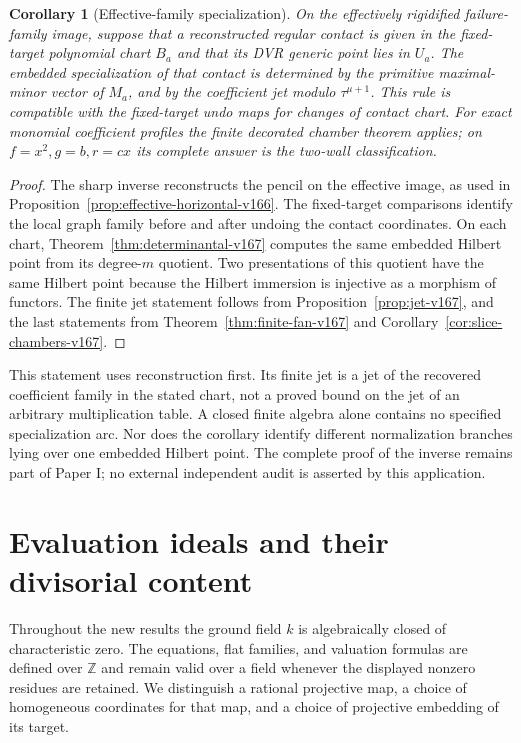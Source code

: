 \documentclass[11pt,reqno]{amsart}
\numberwithin{equation}{section}
\newtheorem{corollary}[theorem]{Corollary}
\theoremstyle{definition}\newtheorem{definition}[theorem]{Definition}
\theoremstyle{remark}\newtheorem{remark}[theorem]{Remark}
\begin{document}
\begin{corollary}[Effective-family specialization]
\label{cor:effective-states-v167}
On the effectively rigidified failure-family image, suppose that
a reconstructed regular contact is given in the fixed-target
polynomial chart $B_a$ and that its DVR generic point lies in
$U_a$. The embedded specialization of that contact is determined
by the primitive maximal-minor vector of $M_a$, and by the
coefficient jet modulo $\tau^{\mu+1}$. This rule is compatible
with the fixed-target undo maps for changes of contact chart.
For exact monomial coefficient profiles the finite decorated
chamber theorem applies; on $f=x^2,g=b,r=cx$ its complete answer
is the two-wall classification.
\end{corollary}
\begin{proof}
The sharp inverse reconstructs the pencil on the effective image,
as used in Proposition~\ref{prop:effective-horizontal-v166}.
The fixed-target comparisons identify the local graph family
before and after undoing the contact coordinates. On each chart,
Theorem~\ref{thm:determinantal-v167} computes the same embedded
Hilbert point from its degree-$m$ quotient. Two presentations
of this quotient have the same Hilbert point because the Hilbert
immersion is injective as a morphism of functors. The finite jet
statement follows from Proposition~\ref{prop:jet-v167}, and the
last statements from Theorem~\ref{thm:finite-fan-v167} and
Corollary~\ref{cor:slice-chambers-v167}.
\end{proof}
This statement uses reconstruction first. Its finite jet is a jet
of the recovered coefficient family in the stated chart, not a
proved bound on the jet of an arbitrary multiplication table.
A closed finite algebra alone contains no specified specialization
arc. Nor does the corollary identify different normalization
branches lying over one embedded Hilbert point. The complete
proof of the inverse remains part of Paper I; no external
independent audit is asserted by this application.

\section{Evaluation ideals and their divisorial content}
\label{sec:content-v169}
Throughout the new results the ground field $k$ is algebraically closed
of characteristic zero. The equations, flat families, and valuation
formulas are defined over $\mathbb Z$ and remain valid over a field
whenever the displayed nonzero residues are retained. We distinguish a
rational projective map, a choice of homogeneous coordinates for that
map, and a choice of projective embedding of its target.
\end{document}
